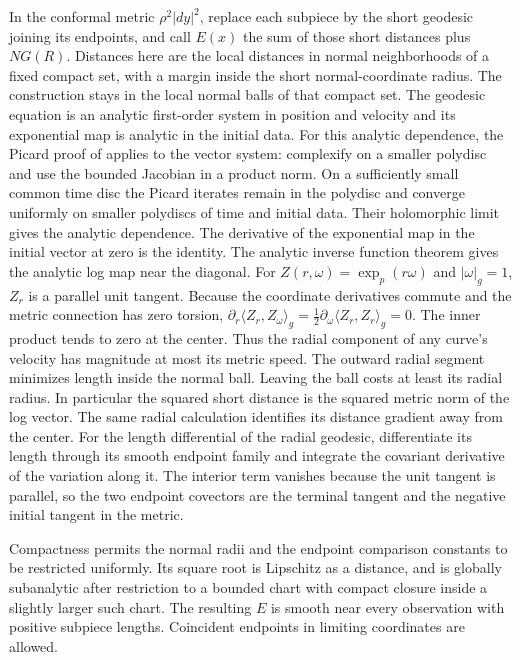 In the conformal metric \(\rho^2|dy|^2\), replace each subpiece by the short geodesic joining its endpoints, and call \(E(x)\) the sum of those short distances plus \(NG(R)\). Distances here are the local distances in normal neighborhoods of a fixed compact set, with a margin inside the short normal-coordinate radius. The construction stays in the local normal balls of that compact set. The geodesic equation is an analytic first-order system in position and velocity and its exponential map is analytic in the initial data. For this analytic dependence, the Picard proof of \cite[Theorem~4.2]{Teschl} applies to the vector system: complexify on a smaller polydisc and use the bounded Jacobian in a product norm. On a sufficiently small common time disc the Picard iterates remain in the polydisc and converge uniformly on smaller polydiscs of time and initial data. Their holomorphic limit gives the analytic dependence. The derivative of the exponential map in the initial vector at zero is the identity. The analytic inverse function theorem gives the analytic log map near the diagonal. For \(Z(r,\omega)=\exp_p(r\omega)\) and \(|\omega|_g=1\), \(Z_r\) is a parallel unit tangent. Because the coordinate derivatives commute and the metric connection has zero torsion, \(\partial_r\langle Z_r,Z_\omega\rangle_g=\frac12\partial_\omega\langle Z_r,Z_r\rangle_g=0\). The inner product tends to zero at the center. Thus the radial component of any curve's velocity has magnitude at most its metric speed. The outward radial segment minimizes length inside the normal ball. Leaving the ball costs at least its radial radius. In particular the squared short distance is the squared metric norm of the log vector. The same radial calculation identifies its distance gradient away from the center. For the length differential of the radial geodesic, differentiate its length through its smooth endpoint family and integrate the covariant derivative of the variation along it. The interior term vanishes because the unit tangent is parallel, so the two endpoint covectors are the terminal tangent and the negative initial tangent in the metric.

Compactness permits the normal radii and the endpoint comparison constants to be restricted uniformly. Its square root is Lipschitz as a distance, and is globally subanalytic after restriction to a bounded chart with compact closure inside a slightly larger such chart. The resulting \(E\) is smooth near every observation with positive subpiece lengths. Coincident endpoints in limiting coordinates are allowed.

